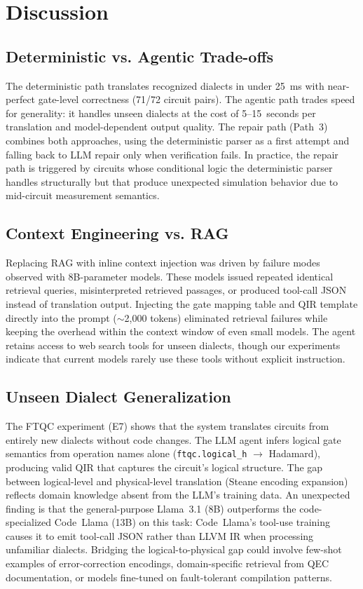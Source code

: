 \documentclass[conference]{IEEEtran}
\begin{document}
\section{Discussion}\label{sec:discussion}

\subsection{Deterministic vs. Agentic Trade-offs}

The deterministic path translates recognized dialects in under 25~ms with near-perfect gate-level correctness (71/72 circuit pairs). The agentic path trades speed for generality: it handles unseen dialects at the cost of 5--15~seconds per translation and model-dependent output quality. The repair path (Path~3) combines both approaches, using the deterministic parser as a first attempt and falling back to LLM repair only when verification fails. In practice, the repair path is triggered by circuits whose conditional logic the deterministic parser handles structurally but that produce unexpected simulation behavior due to mid-circuit measurement semantics.

\subsection{Context Engineering vs. RAG}

Replacing RAG with inline context injection was driven by failure modes observed with 8B-parameter models. These models issued repeated identical retrieval queries, misinterpreted retrieved passages, or produced tool-call JSON instead of translation output. Injecting the gate mapping table and QIR template directly into the prompt ($\sim$2,000 tokens) eliminated retrieval failures while keeping the overhead within the context window of even small models. The agent retains access to web search tools for unseen dialects, though our experiments indicate that current models rarely use these tools without explicit instruction.

\subsection{Unseen Dialect Generalization}

The FTQC experiment (E7) shows that the system translates circuits from entirely new dialects without code changes. The LLM agent infers logical gate semantics from operation names alone (\texttt{ftqc.logical\_h} $\to$ Hadamard), producing valid QIR that captures the circuit's logical structure. The gap between logical-level and physical-level translation (Steane encoding expansion) reflects domain knowledge absent from the LLM's training data. An unexpected finding is that the general-purpose Llama~3.1 (8B) outperforms the code-specialized Code~Llama (13B) on this task: Code~Llama's tool-use training causes it to emit tool-call JSON rather than LLVM IR when processing unfamiliar dialects. Bridging the logical-to-physical gap could involve few-shot examples of error-correction encodings, domain-specific retrieval from QEC documentation, or models fine-tuned on fault-tolerant compilation patterns.
\end{document}
